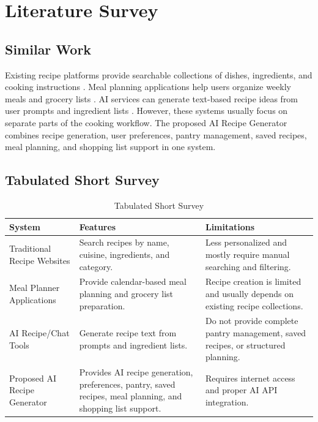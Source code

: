 \section{Literature Survey}

\subsection{Similar Work}
Existing recipe platforms provide searchable collections of dishes, ingredients, and cooking instructions \cite{allrecipes}. Meal planning applications help users organize weekly meals and grocery lists \cite{mealime}. AI services can generate text-based recipe ideas from user prompts and ingredient lists \cite{googleai}. However, these systems usually focus on separate parts of the cooking workflow. The proposed AI Recipe Generator combines recipe generation, user preferences, pantry management, saved recipes, meal planning, and shopping list support in one system.

\subsection{Tabulated Short Survey}
\begin{table}[h]
\centering
\caption{Tabulated Short Survey}
\begin{tabularx}{\textwidth}{|p{3.8cm}|X|X|}
\hline
\textbf{System} & \textbf{Features} & \textbf{Limitations} \\
\hline
Traditional Recipe Websites \cite{allrecipes} & Search recipes by name, cuisine, ingredients, and category. & Less personalized and mostly require manual searching and filtering. \\
\hline
Meal Planner Applications \cite{mealime} & Provide calendar-based meal planning and grocery list preparation. & Recipe creation is limited and usually depends on existing recipe collections. \\
\hline
AI Recipe/Chat Tools \cite{googleai} & Generate recipe text from prompts and ingredient lists. & Do not provide complete pantry management, saved recipes, or structured planning. \\
\hline
Proposed AI Recipe Generator & Provides AI recipe generation, preferences, pantry, saved recipes, meal planning, and shopping list support. & Requires internet access and proper AI API integration. \\
\hline
\end{tabularx}
\end{table}

